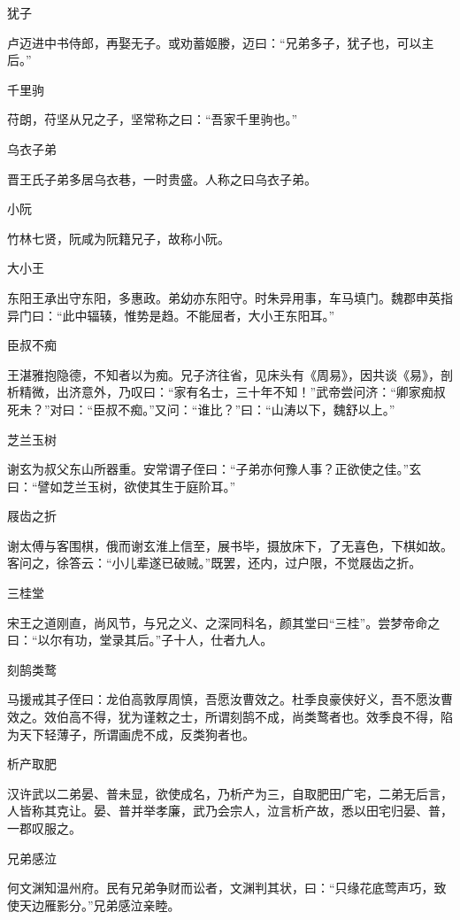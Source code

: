 \documentclass[a4paper,12pt,UTF8,twoside]{ctexbook}
\begin{document}
    犹子
    
    卢迈进中书侍郎，再娶无子。或劝蓄姬媵，迈曰：“兄弟多子，犹子也，可以主后。”
    
    千里驹
    
    苻朗，苻坚从兄之子，坚常称之曰：“吾家千里驹也。”
    
    乌衣子弟
    
    晋王氏子弟多居乌衣巷，一时贵盛。人称之曰乌衣子弟。
    
    小阮
    
    竹林七贤，阮咸为阮籍兄子，故称小阮。
    
    大小王
    
    东阳王承出守东阳，多惠政。弟幼亦东阳守。时朱异用事，车马填门。魏郡申英指异门曰：“此中辐辏，惟势是趋。不能屈者，大小王东阳耳。”
    
    臣叔不痴
    
    王湛雅抱隐德，不知者以为痴。兄子济往省，见床头有《周易》，因共谈《易》，剖析精微，出济意外，乃叹曰：“家有名士，三十年不知！”武帝尝问济：“卿家痴叔死未？”对曰：“臣叔不痴。”又问：“谁比？”曰：“山涛以下，魏舒以上。”
    
    芝兰玉树
    
    谢玄为叔父东山所器重。安常谓子侄曰：“子弟亦何豫人事？正欲使之佳。”玄曰：“譬如芝兰玉树，欲使其生于庭阶耳。”
    
    屐齿之折
    
    谢太傅与客围棋，俄而谢玄淮上信至，展书毕，摄放床下，了无喜色，下棋如故。客问之，徐答云：“小儿辈遂已破贼。”既罢，还内，过户限，不觉屐齿之折。
    
    三桂堂
    
    宋王之道刚直，尚风节，与兄之义、之深同科名，颜其堂曰“三桂”。尝梦帝命之曰：“以尔有功，堂录其后。”子十人，仕者九人。
    
    刻鹄类鹜
    
    马援戒其子侄曰：龙伯高敦厚周慎，吾愿汝曹效之。杜季良豪侠好义，吾不愿汝曹效之。效伯高不得，犹为谨敕之士，所谓刻鹄不成，尚类鹜者也。效季良不得，陷为天下轻薄子，所谓画虎不成，反类狗者也。
    
    析产取肥
    
    汉许武以二弟晏、普未显，欲使成名，乃析产为三，自取肥田广宅，二弟无后言，人皆称其克让。晏、普并举孝廉，武乃会宗人，泣言析产故，悉以田宅归晏、普，一郡叹服之。
    
    兄弟感泣
    
    何文渊知温州府。民有兄弟争财而讼者，文渊判其状，曰：“只缘花底莺声巧，致使天边雁影分。”兄弟感泣亲睦。
    
\end{document}
